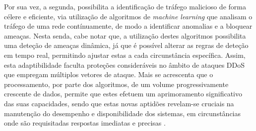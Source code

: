 Por sua vez, a segunda, possibilita a identificação de tráfego malicioso de forma célere e eficiente, via utilização de algoritmos de \textit{machine learning} que analisam o tráfego de uma rede contínuamente, de modo a identificar anomalias e a bloquear ameaças. Nesta senda, cabe notar que, a utilização destes algoritmos possibilita uma deteção de ameaças dinâmica, já que é possível alterar as regras de deteção em tempo real, permitindo ajustar estas a cada circunstância específica. Assim, esta adaptibilidade faculta proteções consideráveis no âmbito de ataques DDoS que empregam múltiplos vetores de ataque. Mais se acrescenta que o processamento, por parte dos algoritmos, de um volume progressivamente crescente de dados, permite que estes efetuem um aprimoramento significativo das suas capacidades, sendo que estas novas aptidões revelam-se cruciais na manutenção do desempenho e disponibilidade dos sistemas, em circunstâncias onde são requisitadas respostas imediatas e precisas \cite{edgenext_ai_ddos_protection}.